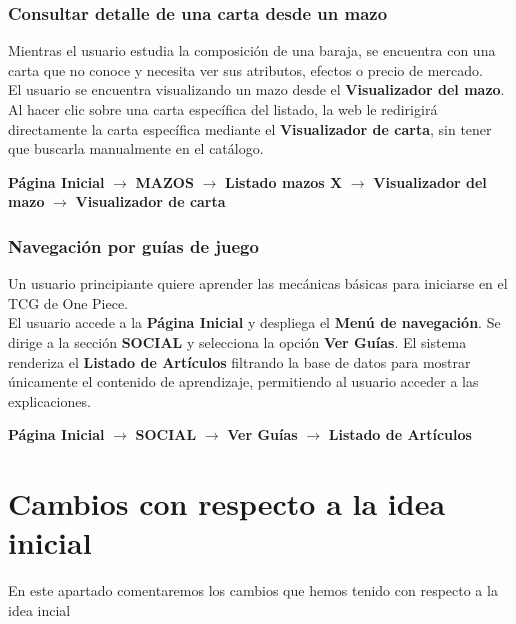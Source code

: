 \documentclass[10pt]{article}
\begin{document}
		\subsubsection{Consultar detalle de una carta desde un mazo}
		Mientras el usuario estudia la composición de una baraja, se encuentra con una carta que no conoce y necesita ver sus atributos, efectos o precio de mercado.\\
		El usuario se encuentra visualizando un mazo desde el \textbf{Visualizador del mazo}. Al hacer clic sobre una carta específica del listado, la web le redirigirá directamente la carta específica mediante el \textbf{Visualizador de carta}, sin tener que buscarla manualmente en el catálogo.
		\begin{center}
			\textbf{Página Inicial} $\rightarrow$ \textbf{MAZOS} $\rightarrow$ \textbf{Listado mazos X} $\rightarrow$ \textbf{Visualizador del mazo} $\rightarrow$ \textbf{Visualizador de carta}
		\end{center}
		
		\subsubsection{Navegación por guías de juego}
		Un usuario principiante quiere aprender las mecánicas básicas para iniciarse en el TCG de One Piece.\\
		El usuario accede a la \textbf{Página Inicial} y despliega el \textbf{Menú de navegación}. Se dirige a la sección \textbf{SOCIAL} y selecciona la opción \textbf{Ver Guías}. El sistema renderiza el \textbf{Listado de Artículos} filtrando la base de datos para mostrar únicamente el contenido de aprendizaje, permitiendo al usuario acceder a las explicaciones.
		\begin{center}
			\textbf{Página Inicial} $\rightarrow$ \textbf{SOCIAL} $\rightarrow$ \textbf{Ver Guías} $\rightarrow$ \textbf{Listado de Artículos}
		\end{center}
		
		
	\newpage
	\section{Cambios con respecto a la idea inicial}
		En este apartado comentaremos los cambios que hemos tenido con respecto a la idea incial
\end{document}
